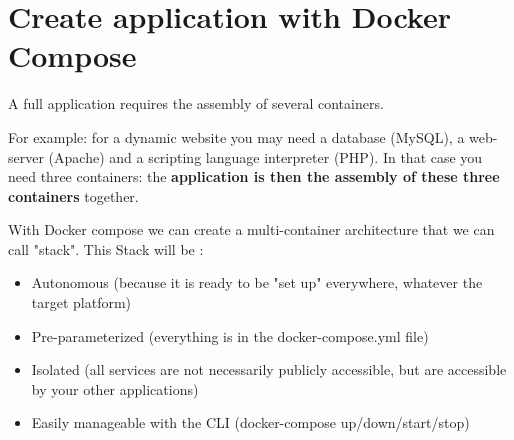 \documentclass[handout]{beamer}[10pt, usepdftitle=false]
\begin{document}
	\section{Create application with Docker Compose}
	\begin{frame}[fragile]
		
	A full application requires the assembly of several containers.
	\vspace*{0.6em} 
	
	For example: for a dynamic website you may need a database (MySQL), a web-server (Apache) and a scripting language interpreter (PHP). In that case you need three containers: the \textbf{application is then the assembly of these three containers} together.
	\vspace*{0.6em}
	
	With Docker compose we can create a multi-container architecture that we can call "stack". This Stack will be :
	\vspace*{0.6em}
	
	\begin{itemize}
	\item{Autonomous (because it is ready to be "set up" everywhere, whatever the target platform)}
	\item{Pre-parameterized (everything is in the docker-compose.yml file)}
	\item{Isolated (all services are not necessarily publicly accessible, but are accessible by your other applications)}
	\item{Easily manageable with the CLI (docker-compose up/down/start/stop)}
	\end{itemize}
	
	\end{frame}
	
\end{document}

